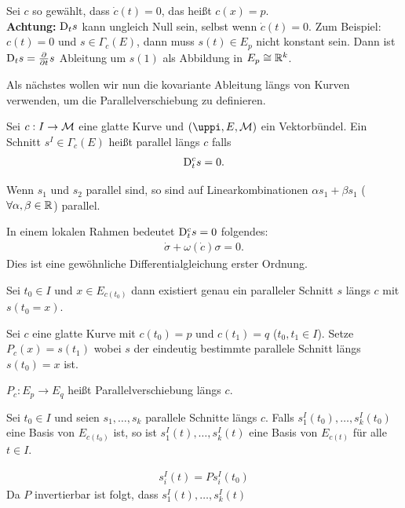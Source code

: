 \begin{bem}
Sei $c$ so gewählt, dass $\dot{c}(t) = 0$, das heißt $c(x)=p$.\\
\textbf{Achtung:} $\mathrm{D}_t s$ kann ungleich Null sein, selbst wenn $\dot{c}(t) = 0$.
Zum Beispiel: $c(t)=0$ und $s \in \Gamma_c (E)$, dann muss $s(t) \in E_p$ nicht konstant sein.
Dann ist $\mathrm{D}_t s = \pdv{t} s $ Ableitung um $s(1)$ als Abbildung in $E_p \cong \mathbb{R}^k$.
\end{bem}
Als nächstes wollen wir nun die kovariante Ableitung längs von Kurven verwenden, um die Parallelverschiebung zu definieren.
\begin{defs}[Parallelität]
Sei $c: I \to \mathcal{M}$ eine glatte Kurve und $(\pi, E, \mfk)$ ein Vektorbündel.
Ein Schnitt $s^I \in \Gamma_c (E)$ heißt parallel längs $c$ falls 
\begin{align}
\mathrm{D}^c_t s = 0.
\end{align}
\end{defs}
\begin{bem}
Wenn $s_1$ und $s_2$ parallel sind, so sind auf Linearkombinationen $\alpha s_1 + \beta s_1$ ($\forall \alpha, \beta \in \mathbb{R}$) parallel.
\end{bem}
In einem lokalen Rahmen bedeutet $\mathrm{D}^c_t s = 0$ folgendes:
\begin{align}
\dot{\sigma} + \omega(\dot{c}) \sigma = 0.
\end{align}
Dies ist eine gewöhnliche Differentialgleichung erster Ordnung.
\begin{lem}
Sei $t_0 \in I$ und $x \in E_{c(t_0)}$ dann existiert genau ein paralleler Schnitt $s$ längs $c$ mit $s(t_0 = x)$.
\end{lem}
Sei $c$ eine glatte Kurve mit $c(t_0) = p$ und $c(t_1)=q$ ($t_0, t_1 \in I$).
Setze $P_c(x) = s(t_1)$ wobei $s$ der eindeutig bestimmte parallele Schnitt längs $s(t_0) = x$ ist.
\begin{defs}[Parallelverschiebung]
$P_c : E_p \to E_q$ heißt Parallelverschiebung längs $c$.
\end{defs}
\begin{lem}
\label{lem:BasisVB}
Sei $t_0 \in I$ und seien $s_1, \dots, s_k$ parallele Schnitte längs $c$.
Falls $s^I_1 (t_0), \dots, s^I_k (t_0)$ eine Basis von $E_{c(t_0)}$ ist, so ist $s^I_1 (t), \dots, s^I_k (t)$ eine Basis von $E_{c(t)}$ für alle $t \in I$.
\end{lem}
\begin{bew}
\begin{align}
s^I_i (t) = Ps^I_i (t_0)
\end{align}
Da $P$ invertierbar ist folgt, dass $s^I_1 (t), \dots, s^I_k (t)$
\end{bew}
